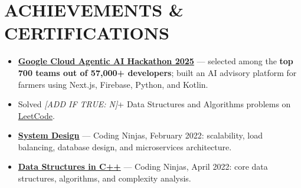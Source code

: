 \documentclass[letterpaper,11pt]{article}
\newcommand{\resumeItem}[1]{
  \item\small{
    {#1 \vspace{-2pt}}
  }
}
\newcommand{\resumeItemListStart}{\begin{itemize}}
\newcommand{\resumeItemListEnd}{\end{itemize}\vspace{-5pt}}
\begin{document}
\vspace{-6pt}

\section{ACHIEVEMENTS \& CERTIFICATIONS}
    \vspace{2pt}
    \resumeItemListStart
        \resumeItem{\textbf{\href{https://github.com/abhikumar002/Agentic-Gig-Project}{Google Cloud Agentic AI Hackathon 2025}} — selected among the \textbf{top 700 teams out of 57,000+ developers}; built an AI advisory platform for farmers using Next.js, Firebase, Python, and Kotlin.}
        \resumeItem{Solved \textit{[ADD IF TRUE: N]}+ Data Structures and Algorithms problems on \href{https://leetcode.com/u/sachinkumar6174/}{LeetCode}.}
        \resumeItem{\textbf{\href{http://ninjasfiles.s3.amazonaws.com/certificate18894980e4209379ac28665887f78da42bac5c2.pdf}{System Design}} — Coding Ninjas, February 2022: scalability, load balancing, database design, and microservices architecture.}
        \resumeItem{\textbf{\href{https://ninjasfiles.s3.amazonaws.com/certificate19853580c201378561a01f48ae87f59e9220db2.pdf}{Data Structures in C++}} — Coding Ninjas, April 2022: core data structures, algorithms, and complexity analysis.}
    \resumeItemListEnd
\end{document}
